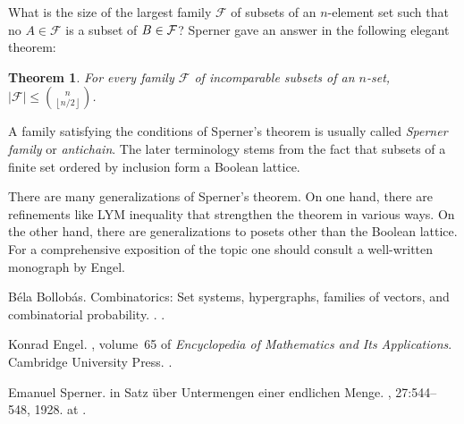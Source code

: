 \documentclass[12pt]{article}
\newtheorem*{theorem}{Theorem}
\newcommand*{\abs}[1]{\left\lvert #1\right\rvert}
\newcommand*{\floor}[1]{\left\lfloor #1\right\rfloor}
\begin{document}
What is the size of the largest family $\mathcal{F}$ of subsets of
an $n$-element set such that no $A\in \mathcal{F}$ is a subset of
$B\in \cal{F}$? Sperner \cite{cite:sperner_antichain} gave an
answer in the following elegant theorem:
\begin{theorem}
For every family $\mathcal{F}$ of incomparable subsets of an
$n$-set, $\abs{\mathcal{F}}\leq \binom{n}{\floor{n/2}}$.
\end{theorem}
A family satisfying the conditions of Sperner's theorem is usually
called \emph{Sperner family} or \emph{antichain}. The later
terminology stems from the fact that subsets of a finite set
ordered by inclusion form a Boolean lattice.

There are many generalizations of Sperner's theorem. On one hand,
there are refinements like LYM inequality that strengthen the
theorem in various ways. On the other hand, there are
generalizations to posets other than the Boolean lattice. For a
comprehensive exposition of the topic one should consult a
well-written monograph by Engel\cite{cite:engel_sperner}.

\begin{thebibliography}{1}

B{\'e}la Bollob{\'a}s.
\newblock Combinatorics: Set systems, hypergraphs, families of vectors, and
  combinatorial probability.
.
\newblock {}.

Konrad Engel.
, volume~65 of {\em Encyclopedia of Mathematics
  and Its Applications}.
\newblock Cambridge University Press.
\newblock {}.

Emanuel Sperner.
in {S}atz {\"u}ber {U}ntermengen einer endlichen {M}enge.
, 27:544--548, 1928.
\newblock {} at
  .

\end{thebibliography}
\end{document}
